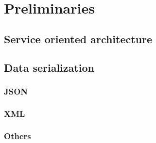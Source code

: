 \newpage
\section{Preliminaries}

\subsection{Service oriented architecture}
\subsection{Data serialization}
\subsubsection{JSON}
\subsubsection{XML}
\subsubsection{Others}